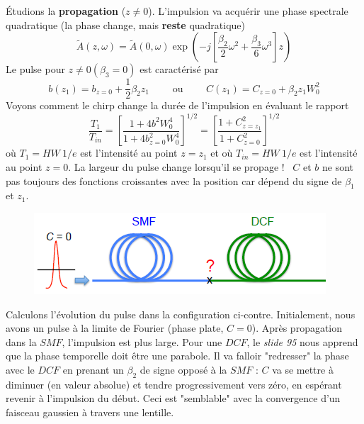  	Étudions la \textbf{propagation} ($z\neq0$). L'impulsion va acquérir une phase spectrale 
 	quadratique (la phase change, mais \textbf{reste} quadratique)
 	\begin{equation}
 	\tilde A(z,\omega ) = \tilde A(0,\omega )\exp ( - j[\frac{{{\beta _2}}}{2}{\omega ^2} + \frac{{{\beta _3}}}{6}{\omega ^3}]z)
 	\end{equation}
 	Le pulse pour $z\neq0 (\beta_3=0)$ est caractérisé par
 	\begin{equation}
 	b({z_1}) = {b_{z = 0}} + \frac{1}{2}{\beta _2}{z_1}
 	\qquad\text{ ou }\qquad
 	C({z_1}) = {C_{z = 0}} + {\beta _2}{z_1}W_0^2
 	\end{equation}
	Voyons comment le chirp change la durée de l'impulsion en évaluant le rapport
	\begin{equation}
	\frac{{{T_1}}}{{{T_{in}}}} = {\left[ {\frac{{1 + 4{b^2}W_0^4}}{{1 + 4b_{z = 0}^2W_0^4}}}
	 \right]^{1/2}} = {\left[ {\frac{{1 + C_{z = {z_1}}^2}}{{1 + C_{z = 0}^2}}} \right]^{1/2}}
	\end{equation}
	où $T_1 = HW\ 1/e$ est l'intensité au point $z=z_1$	et où $T_{in} = HW\ 1/e$ est l'intensité
	au point $z=0$. La largeur du pulse change lorsqu'il se propage ! \danger\ $C$ et $b$ ne sont
	pas toujours des fonctions croissantes avec la position car dépend du signe de $\beta_1$ et
	$z_1$.\\
	
	\begin{figure}
	\vspace{-8mm}
	\includegraphics[scale=0.5]{ch1/image36}
	\end{figure}
	Calculons l'évolution du pulse dans la configuration ci-contre. Initialement, nous avons un
	pulse à la limite de Fourier (phase plate, $C=0$). Après propagation dans la $SMF$, 
	l'impulsion est plus large. Pour une $DCF$, le \textit{slide 95} nous apprend que la phase
	temporelle doit être une parabole. Il va falloir "redresser" la phase avec le $DCF$ en prenant
	un $\beta_2$ de signe opposé à la $SMF$ : $C$ va se mettre à diminuer (en valeur absolue) et
	tendre progressivement vers zéro, en espérant revenir à l'impulsion du début. Ceci est 
	"semblable" avec la convergence d'un faisceau gaussien à travers une lentille.\\
	
